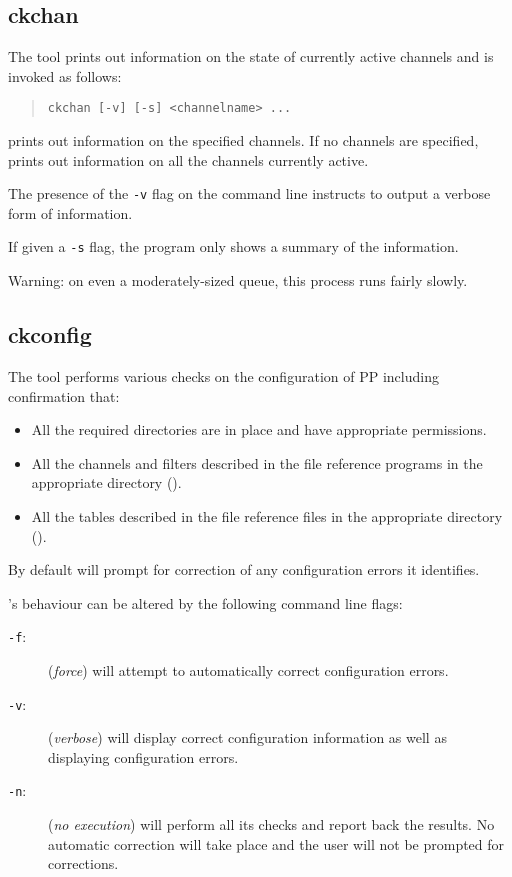 \subsection     {ckchan}

The  tool prints out information on the state of 
currently active channels and is invoked as follows:

\begin{quote}\small\begin{verbatim}
ckchan [-v] [-s] <channelname> ...
\end{verbatim}\end{quote}
 prints out information on the specified channels.
If no channels are specified,  prints out information on
all the channels currently active.

The presence of the \verb+-v+ flag on the command line instructs
 to output a verbose form of information.

If given a \verb|-s| flag, the program only shows a summary of the
information.

Warning: on even a moderately-sized queue, this process runs fairly
slowly.

\subsection	{ckconfig}\label{sect:ckconfig}

The  tool performs various checks on the 
configuration of PP including confirmation that:
\begin{itemize}
\item	All the required directories are in place and have appropriate
permissions.

\item	All the channels and filters described in the
 file reference programs in the appropriate directory
(). 

\item	All the tables described in the  file reference
files in the appropriate directory ().
\end{itemize}

By default  will prompt for
correction of any configuration errors it identifies.

's behaviour can be altered by the following command
line flags:
\begin{description}
\item[\verb+-f+:] ({\em force})  will attempt
to automatically correct configuration errors.
\item[\verb+-v+:] ({\em verbose})  will
display correct configuration information as well as displaying 
configuration errors.
\item[\verb+-n+:] ({\em no execution})  will perform all
its checks and report back the results.
No automatic correction will take place and the user will not be prompted
for corrections.

\end{description}

